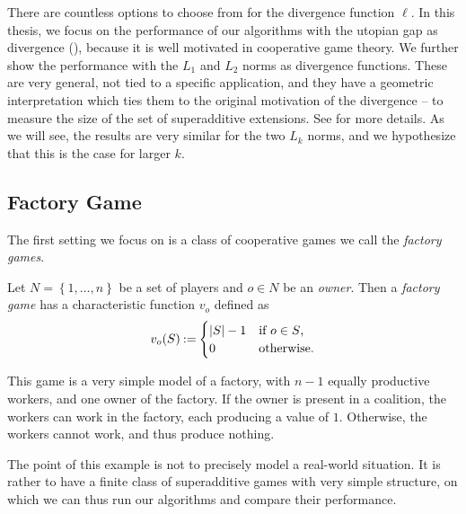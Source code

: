 There are countless options to choose from for the divergence function $ \ell $.
In this thesis, we focus on the performance of our algorithms with the utopian gap as divergence (), because it is well motivated in cooperative game theory.
We further show the performance with the $ L_1 $ and $ L_2 $ norms as divergence functions.
These are very general, not tied to a specific application, and they have a geometric interpretation which ties them to the original motivation of the divergence -- to measure the size of the set of superadditive extensions.
See  for more details.
As we will see, the results are very similar for the two $ L_k $ norms, and we hypothesize that this is the case for larger $k$.

\subsection{Factory Game}

The first setting  we focus on is a class of cooperative games we call the \emph{factory games}.

\begin{defi}
  Let $ N = \left\{ 1, \ldots, n \right\} $ be a set of players and $ o \in N $ be an \emph{owner}.
  Then a \emph{factory game} has a characteristic function $ v_o $ defined as \[
    v_o\!\left(S\right) \mathbin{:=} \begin{cases}
      \left\lvert S \right\rvert - 1 & \text{if $ o \in S $,} \\
      0                & \text{otherwise.}
    \end{cases}
  \]
\end{defi}

This game is a very simple model of a factory, with $ n-1 $ equally productive workers, and one owner of the factory.
If the owner is present in a coalition, the workers can work in the factory, each producing a value of $ 1 $.
Otherwise, the workers cannot work, and thus produce nothing.

The point of this example is not to precisely model a real-world situation.
It is rather to have a finite class of superadditive games with very simple structure, on which we can thus run our algorithms and compare their performance.

